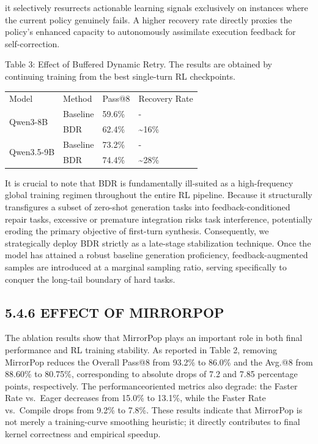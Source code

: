 \documentclass[
  10
]{article}
\newcounter{none} %
\begin{document}
it selectively resurrects actionable learning signals exclusively on
instances where the current policy genuinely fails. A higher recovery
rate directly proxies the policy's enhanced capacity to autonomously
assimilate execution feedback for self-correction.

Table 3: Effect of Buffered Dynamic Retry. The results are obtained by
continuing training from the best single-turn RL checkpoints.

{\def\LTcaptype{none} %
\begin{longtable}[]{@{}llll@{}}
\toprule\noalign{}
\endhead
\bottomrule\noalign{}
\endlastfoot
Model & Method & Pass@8 & Recovery Rate \\
\multirow{2}{*}{Qwen3-8B} & Baseline & 59.6\% & - \\
& BDR & 62.4\% & \textasciitilde16\% \\
\multirow{2}{*}{Qwen3.5-9B} & Baseline & 73.2\% & - \\
& BDR & 74.4\% & \textasciitilde28\% \\
\end{longtable}
}

It is crucial to note that BDR is fundamentally ill-suited as a
high-frequency global training regimen throughout the entire RL
pipeline. Because it structurally transfigures a subset of zero-shot
generation tasks into feedback-conditioned repair tasks, excessive or
premature integration risks task interference, potentially eroding the
primary objective of first-turn synthesis. Consequently, we
strategically deploy BDR strictly as a late-stage stabilization
technique. Once the model has attained a robust baseline generation
proficiency, feedback-augmented samples are introduced at a marginal
sampling ratio, serving specifically to conquer the long-tail boundary
of hard tasks.

\subsection{5.4.6 EFFECT OF MIRRORPOP}\label{effect-of-mirrorpop}

The ablation results show that MirrorPop plays an important role in both
final performance and RL training stability. As reported in Table 2,
removing MirrorPop reduces the Overall Pass@8 from 93.2\% to 86.0\% and
the Avg.@8 from 88.60\% to 80.75\%, corresponding to absolute drops of
7.2 and 7.85 percentage points, respectively. The performanceoriented
metrics also degrade: the Faster Rate vs.~Eager decreases from 15.0\% to
13.1\%, while the Faster Rate vs.~Compile drops from 9.2\% to 7.8\%.
These results indicate that MirrorPop is not merely a training-curve
smoothing heuristic; it directly contributes to final kernel correctness
and empirical speedup.
\end{document}
